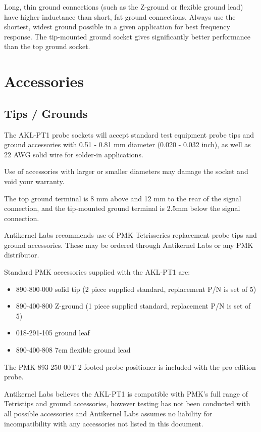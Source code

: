 \documentclass[11pt]{article}
\begin{document}
Long, thin ground connections (such as the Z-ground or flexible ground lead) have higher inductance than short, fat
ground connections. Always use the shortest, widest ground possible in a given application for best frequency response.
The tip-mounted ground socket gives significantly better performance than the top ground socket.

\section{Accessories}

\subsection{Tips / Grounds}

The AKL-PT1 probe sockets will accept standard test equipment probe tips and ground accessories with 0.51 - 0.81 mm
diameter (0.020 - 0.032 inch), as well as 22 AWG solid wire for solder-in applications.

Use of accessories with larger or smaller diameters may damage the socket and void your warranty.

The top ground terminal is 8 mm above and 12 mm to the rear of the signal connection, and the tip-mounted ground
terminal is 2.5mm below the signal connection.

Antikernel Labs recommends use of PMK Tetris\textregistered series replacement probe tips and ground accessories.
These may be ordered through Antikernel Labs or any PMK distributor.

Standard PMK accessories supplied with the AKL-PT1 are:
\begin{itemize}
\item 890-800-000 solid tip (2 piece supplied standard, replacement P/N is set of 5)
\item 890-400-800 Z-ground (1 piece supplied standard, replacement P/N is set of 5)
\item 018-291-105 ground leaf
\item 890-400-808 7cm flexible ground lead
\end{itemize}

The PMK 893-250-00T 2-footed probe positioner is included with the pro edition probe.

Antikernel Labs believes the AKL-PT1 is compatible with PMK's full range of Tetris\textregistered tips and ground
accessories, however testing has not been conducted with all possible accessories and Antikernel Labs assumes no
liability for incompatibility with any accessories not listed in this document.
\end{document}
